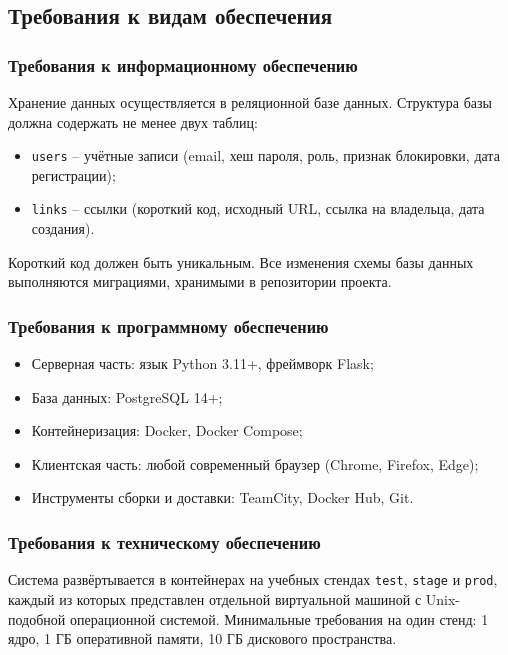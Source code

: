 \documentclass[14pt, a4paper]{extarticle}
\begin{document}
\subsection{Требования к видам обеспечения}

\subsubsection{Требования к информационному обеспечению}

Хранение данных осуществляется в реляционной базе данных. Структура базы должна содержать не менее двух таблиц:

\begin{itemize}
	\item \texttt{users} -- учётные записи (email, хеш пароля, роль, признак блокировки, дата регистрации);
	\item \texttt{links} -- ссылки (короткий код, исходный URL, ссылка на владельца, дата создания).
\end{itemize}

Короткий код должен быть уникальным. Все изменения схемы базы данных выполняются миграциями, хранимыми в репозитории проекта.

\subsubsection{Требования к программному обеспечению}

\begin{itemize}
	\item Серверная часть: язык Python 3.11+, фреймворк Flask;
	\item База данных: PostgreSQL 14+;
	\item Контейнеризация: Docker, Docker Compose;
	\item Клиентская часть: любой современный браузер (Chrome, Firefox, Edge);
	\item Инструменты сборки и доставки: TeamCity, Docker Hub, Git.
\end{itemize}

\subsubsection{Требования к техническому обеспечению}

Система развёртывается в контейнерах на учебных стендах \texttt{test}, \texttt{stage} и \texttt{prod}, каждый из которых представлен отдельной виртуальной машиной с Unix-подобной операционной системой. Минимальные требования на один стенд: 1 ядро, 1 ГБ оперативной памяти, 10 ГБ дискового пространства.
\end{document}
